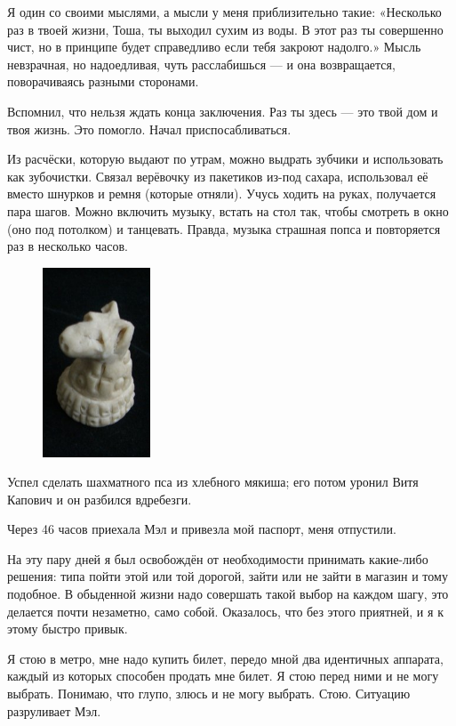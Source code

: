 \documentclass{book}
\begin{document}
Я один со своими мыслями, а мысли у меня приблизительно такие:
«Несколько раз в твоей жизни, Тоша, ты выходил сухим из воды.
В этот раз ты совершенно чист, но в принципе будет справедливо если тебя закроют надолго.»
Мысль невзрачная, но надоедливая, чуть расслабишься --- и она возвращается, поворачиваясь разными сторонами.

Вспомнил, что нельзя ждать конца заключения.
Раз ты здесь --- это твой дом и твоя жизнь.
Это помогло.
Начал приспосабливаться.

Из расчёски, которую выдают по утрам, можно выдрать зубчики и использовать как зубочистки.
Связал верёвочку из пакетиков из-под сахара, использовал её вместо шнурков и ремня (которые отняли).
Учусь ходить на руках, получается пара шагов.
Можно включить музыку, встать на стол так, чтобы смотреть в окно (оно под потолком) и танцевать.
Правда, музыка страшная попса и повторяется раз в несколько часов.

\begin{figure}
\vskip-4mm
\centering
\includegraphics[width=32mm,angle=0]{pics/kon}
\end{figure}

Успел сделать шахматного пса из хлебного мякиша;
его потом уронил Витя Капович и он разбился вдребезги.

Через 46 часов приехала Мэл и привезла мой паспорт, меня отпустили.

На эту пару дней я был освобождён от необходимости принимать какие-либо решения:
типа пойти этой или той дорогой, зайти или не зайти в магазин и тому подобное.
В обыденной жизни надо совершать такой выбор на каждом шагу, это делается почти незаметно, само собой.
Оказалось, что без этого приятней, и я к этому быстро привык.

Я стою в метро, мне надо купить билет, передо мной два идентичных аппарата, каждый из которых способен продать мне билет.
Я стою перед ними и не могу выбрать.
Понимаю, что глупо, злюсь и не могу выбрать.
Стою.
Ситуацию разруливает Мэл.
\end{document}
